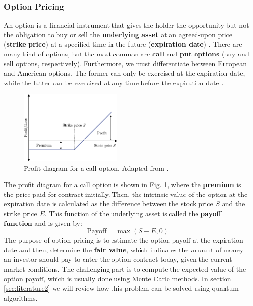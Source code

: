 \documentclass[prx,twocolumn,floatfix,superscriptaddress,longbibliography]{revtex4-1}
\begin{document}
\subsubsection{Option Pricing}
An option is a financial instrument that gives the holder the opportunity but not the obligation to buy or sell the  \textbf{underlying asset} at an agreed-upon price (\textbf{strike price}) at a specified time in the future (\textbf{expiration date}) \cite{Wilmott2007}. There are many kind of options, 
but the most common are \textbf{call} and \textbf{put options} (buy and sell options, respectively). Furthermore, we must 
differentiate between European and American options. The former can only be exercised at the expiration date, while the latter can be exercised at any time before the expiration date \cite{Rebentrost2018}. 
\begin{figure}
\centering
\includegraphics[width=0.45\textwidth]{pay-off.pdf}
  \caption{\label{fig:profit-diagram} Profit diagram for a call option. Adapted from \cite{Wilmott2007}.}
\end{figure}

The profit diagram for a call option is shown in Fig. \ref{fig:profit-diagram}, where the \textbf{premium} is the price paid for contract initially. Then, the 
intrinsic value of the option at the expiration date is calculated as the difference between the stock price $S$ and the strike price $E$. 
This function of the underlying asset is called the \textbf{payoff function} and is given by:
\begin{equation}
  \label{eq:8}
  \text{Payoff} = \max(S - E, 0)
\end{equation}
The purpose of option pricing is to estimate the option payoff at the expiration date and then, determine the \textbf{fair value}, which indicates the amount of money an 
investor should pay to enter the option contract today, given the current market conditions. 
The challenging part is to compute the expected value of the option payoff, which is usually done using Monte Carlo methods. In section \ref{sec:literature2} we will review how this problem can be solved using quantum algorithms.
\end{document}
